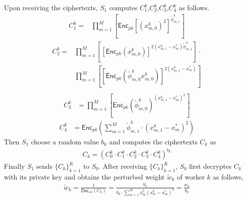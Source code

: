 \documentclass[conference]{IEEEtran}
\begin{document}
Upon receiving the ciphertexts, $S_1$ computes $C_1^k$,$C_2^k$,$C_3^k$,$C_4^k$ as follows.
\begin{equation}
  \begin{split}
  C_1^k = &\prod_{m=1}^M\left[ \mathsf{Enc}_{pk}{[(x_{m,0}^k)^2]}^{\tilde{\phi}_{m,1}^k} \right]
  \end{split}
\end{equation}
\begin{equation}
  \begin{split}
  C_2^k = & \prod_{m=1}^M\left[ \left[\mathsf{Enc}_{pk}\left(x_{m,0}^k\right)\right]^{2(x_{m,1}^k - x_m^*)\tilde{\phi}_{m,1}^k}\right] \cdot \\
          & \prod_{m=1}^M\left[ \left[\mathsf{Enc}_{pk}\left(\tilde{\phi}_{m,0}^k x_{m,0}^k\right)\right]^{2(x_{m,1}^k - x_m^*)} \right] \\
  \end{split}
\end{equation}
\begin{equation}
  \begin{split}
    C_3^k & = \prod_{m=1}^M\left[ \mathsf{Enc}_{pk}(\tilde{\phi}_{m,0}^k)^{(x_{m,1}^k - x_m^*)^2} \right]
  \end{split}
\end{equation}
\begin{equation}
  \begin{split}
    C_4^k & = \mathsf{Enc}_{pk}(\sum_{m=1}^M \tilde{\phi}_{m,1}^k \cdot (x_{m,1}^k - x_m^*)^2)
  \end{split}
\end{equation}
Then $S_1$ choose a random value $b_k$ and computes the ciphertexts $C_k$ as 
\begin{equation}
  \begin{split}
    C_k = \left(C_0^k\cdot C_1^k\cdot C_2^k\cdot C_3^k \cdot C_4^k\right)^{b_k}
  \end{split}
\end{equation}
Finally $S_1$ sends $\{C_k\}_{k=1}^K$ to $S_0$.
After receiving $\{C_k\}_{k=1}^K$, $S_0$ first decryptes $C_k$ with its private key and obtains the perturbed weight $\tilde{w}_k$ of worker $k$ as follows,
\begin{equation}
  \begin{split}
    \tilde{w}_k = \frac{1}{\mathsf{Dec}_{sk}(C_k)} = \frac{y_k}{b_k\cdot \sum_{m=1}^M \phi_m^k(x_m^k - x_m^*)^2} = \frac{w_k}{b_k}
  \end{split}
\end{equation}
\end{document}
